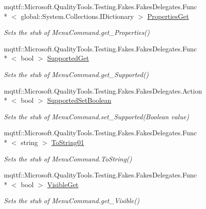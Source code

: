 \begin{DoxyCompactItemize}
mqttf\-::\-Microsoft.\-Quality\-Tools.\-Testing.\-Fakes.\-Fakes\-Delegates.\-Func\\*
$<$ global\-::\-System.\-Collections.\-I\-Dictionary $>$ \hyperlink{class_system_1_1_component_model_1_1_design_1_1_fakes_1_1_stub_menu_command_a80b7b6f424bd206fa04c1d469007a2dc}{Properties\-Get}
\begin{DoxyCompactList}\small\item\em Sets the stub of Menu\-Command.\-get\-\_\-\-Properties()\end{DoxyCompactList}\item 
mqttf\-::\-Microsoft.\-Quality\-Tools.\-Testing.\-Fakes.\-Fakes\-Delegates.\-Func\\*
$<$ bool $>$ \hyperlink{class_system_1_1_component_model_1_1_design_1_1_fakes_1_1_stub_menu_command_a4b504d0c5bdbfda99cea2a27cc7fc680}{Supported\-Get}
\begin{DoxyCompactList}\small\item\em Sets the stub of Menu\-Command.\-get\-\_\-\-Supported()\end{DoxyCompactList}\item 
mqttf\-::\-Microsoft.\-Quality\-Tools.\-Testing.\-Fakes.\-Fakes\-Delegates.\-Action\\*
$<$ bool $>$ \hyperlink{class_system_1_1_component_model_1_1_design_1_1_fakes_1_1_stub_menu_command_ac9347735ca1e6a9954e8291702340480}{Supported\-Set\-Boolean}
\begin{DoxyCompactList}\small\item\em Sets the stub of Menu\-Command.\-set\-\_\-\-Supported(\-Boolean value)\end{DoxyCompactList}\item 
mqttf\-::\-Microsoft.\-Quality\-Tools.\-Testing.\-Fakes.\-Fakes\-Delegates.\-Func\\*
$<$ string $>$ \hyperlink{class_system_1_1_component_model_1_1_design_1_1_fakes_1_1_stub_menu_command_a4224dc6328dbd5e281752a9c8bf7e329}{To\-String01}
\begin{DoxyCompactList}\small\item\em Sets the stub of Menu\-Command.\-To\-String()\end{DoxyCompactList}\item 
mqttf\-::\-Microsoft.\-Quality\-Tools.\-Testing.\-Fakes.\-Fakes\-Delegates.\-Func\\*
$<$ bool $>$ \hyperlink{class_system_1_1_component_model_1_1_design_1_1_fakes_1_1_stub_menu_command_a8c701ed5addc825ffcfea5eef75f3e91}{Visible\-Get}
\begin{DoxyCompactList}\small\item\em Sets the stub of Menu\-Command.\-get\-\_\-\-Visible()\end{DoxyCompactList}\item 

\end{DoxyCompactItemize}
